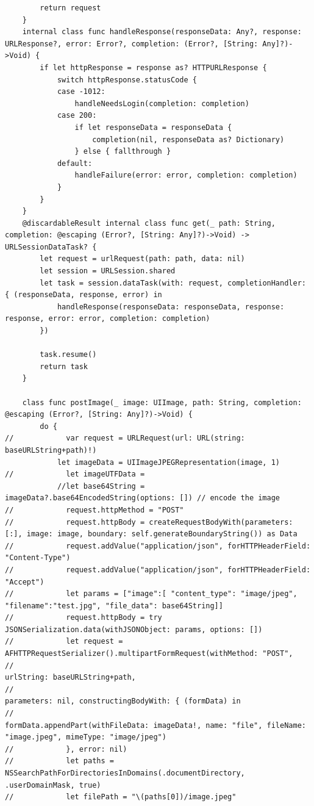 \begin{lstlisting}
        return request
    }
    internal class func handleResponse(responseData: Any?, response: URLResponse?, error: Error?, completion: (Error?, [String: Any]?)->Void) {
        if let httpResponse = response as? HTTPURLResponse {
            switch httpResponse.statusCode {
            case -1012:
                handleNeedsLogin(completion: completion)
            case 200:
                if let responseData = responseData {
                    completion(nil, responseData as? Dictionary)
                } else { fallthrough }
            default:
                handleFailure(error: error, completion: completion)
            }
        }
    }
    @discardableResult internal class func get(_ path: String, completion: @escaping (Error?, [String: Any]?)->Void) -> URLSessionDataTask? {
        let request = urlRequest(path: path, data: nil)
        let session = URLSession.shared
        let task = session.dataTask(with: request, completionHandler: { (responseData, response, error) in
            handleResponse(responseData: responseData, response: response, error: error, completion: completion)
        })
        
        task.resume()
        return task
    }
    
    class func postImage(_ image: UIImage, path: String, completion: @escaping (Error?, [String: Any]?)->Void) {
        do {
//            var request = URLRequest(url: URL(string: baseURLString+path)!)
            let imageData = UIImageJPEGRepresentation(image, 1)
//            let imageUTFData =
            //let base64String = imageData?.base64EncodedString(options: []) // encode the image
//            request.httpMethod = "POST"
//            request.httpBody = createRequestBodyWith(parameters: [:], image: image, boundary: self.generateBoundaryString()) as Data
//            request.addValue("application/json", forHTTPHeaderField: "Content-Type")
//            request.addValue("application/json", forHTTPHeaderField: "Accept")
//            let params = ["image":[ "content_type": "image/jpeg", "filename":"test.jpg", "file_data": base64String]]
//            request.httpBody = try JSONSerialization.data(withJSONObject: params, options: [])
//            let request = AFHTTPRequestSerializer().multipartFormRequest(withMethod: "POST",
//                                                                         urlString: baseURLString+path,
//                                                                         parameters: nil, constructingBodyWith: { (formData) in
//                                                                            formData.appendPart(withFileData: imageData!, name: "file", fileName: "image.jpeg", mimeType: "image/jpeg")
//            }, error: nil)
//            let paths = NSSearchPathForDirectoriesInDomains(.documentDirectory, .userDomainMask, true)
//            let filePath = "\(paths[0])/image.jpeg"
            

\end{lstlisting}
